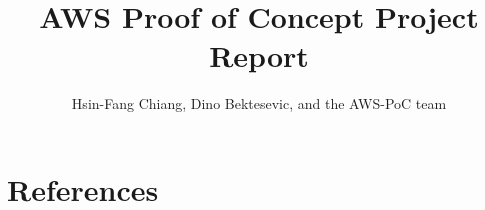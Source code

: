 \documentclass[DM,authoryear,toc]{lsstdoc}
\title{AWS Proof of Concept Project Report}
\author{
Hsin-Fang Chiang, Dino Bektesevic, and the AWS-PoC team
}
\date{\vcsDate}
\begin{document}
\mkshorttitle



\appendix

\section{References} \label{sec:bib}


%
\end{document}
